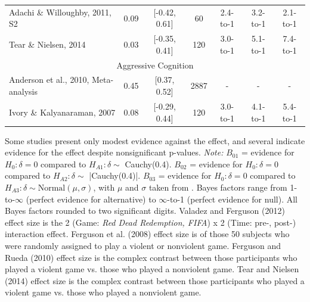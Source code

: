 \documentclass[man]{apa6}
\begin{document}
\begin{table}
\begin{tabular}{lcccccc}
\hspace{.2in} Adachi \& Willoughby, 2011, S2&0.09&[-0.42, 0.61]&60&2.4-to-1&3.2-to-1&2.1-to-1 \\
\hspace{.2in} Tear \& Nielsen, 2014 &0.03&[-0.35, 0.41]&120&3.0-to-1&5.1-to-1&7.4-to-1 \\
\multicolumn{7}{c}{Aggressive Cognition}\\
Anderson et al., 2010, Meta-analysis&0.45&[0.37, 0.52]&2887&-&-&- \\
\hspace{.2in} Ivory \& Kalyanaraman, 2007&0.08&[-0.29, 0.44]&120&3.0-to-1&4.1-to-1&5.4-to-1 \\ \hline
\end{tabular}

\vspace{4mm}
Some studies present only modest evidence against the effect, and several indicate evidence for the effect despite nonsignificant p-values. 
{\em Note:} $B_{01}$ = evidence for $H_0: \delta = 0$ compared to $H_{A1}: \delta \sim$ Cauchy(0.4). $B_{02}$ = evidence for $H_0: \delta = 0$ compared to $H_{A2}: \delta \sim$ |Cauchy(0.4)|. $B_{03}$ = evidence for $H_0: \delta = 0$ compared to $H_{A3}: \delta \sim \mbox{Normal}(\mu, \sigma)$, with $\mu$ and $\sigma$ taken from \citet{Anderson:etal:2010}. Bayes factors range from 1-to-$\infty$ (perfect evidence for alternative) to $\infty$-to-1 (perfect evidence for null). All Bayes factors rounded to two significant digits. Valadez and Ferguson (2012) effect size is the 2 (Game: {\em Red Dead Redemption, FIFA}) x 2 (Time: pre-, post-) interaction effect. Ferguson et al. (2008) effect size is of those 50 subjects who were randomly assigned to play a violent or nonviolent game. Ferguson and Rueda (2010) effect size is the complex contrast between those participants who played a violent game vs. those who played a nonviolent game. Tear and Nielsen (2014) effect size is the complex contrast between those participants who played a violent game vs. those who played a nonviolent game.
\label{mainStudyResults}
\end{table}
\end{document}

